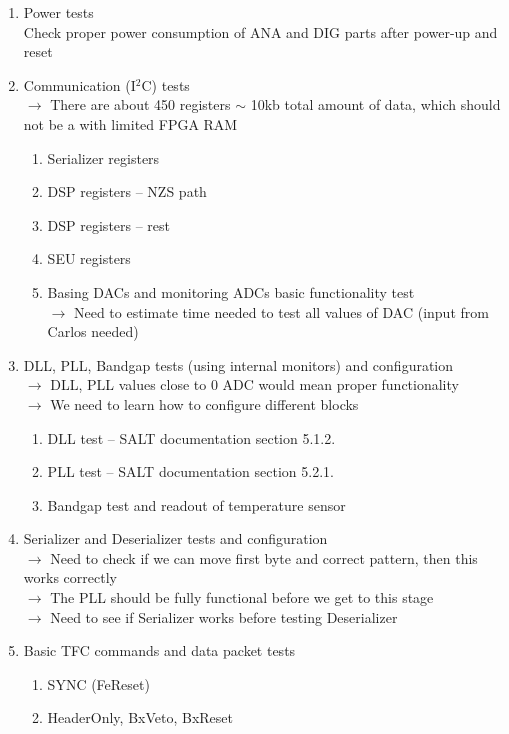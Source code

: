 \documentclass{lhcbnote}
\begin{document}
\begin{enumerate}
\item Power tests \\
Check proper power consumption of ANA and DIG parts after power-up and reset
\item Communication (I$^2$C) tests \\
$\rightarrow$ There are about 450 registers $\sim$ 10kb total amount of data, which should not be a with limited FPGA RAM
\begin{enumerate}
\item Serializer registers
\item DSP registers – NZS path
\item DSP registers – rest
\item SEU registers
\item Basing DACs and monitoring ADCs basic functionality test \\
$\rightarrow$ Need to estimate time needed to test all values of DAC (input from Carlos needed)
\end{enumerate}

\item DLL, PLL, Bandgap tests (using internal monitors) and configuration \\
$\rightarrow$ DLL, PLL values close to 0 ADC would mean proper functionality \\
$\rightarrow$ We need to learn how to configure different blocks
\begin{enumerate}
\item DLL test – SALT documentation section 5.1.2.
\item PLL test – SALT documentation section 5.2.1.
\item Bandgap test and readout of temperature sensor
\end{enumerate}

\item Serializer and Deserializer tests and configuration \\
$\rightarrow$ Need to check if we can move first byte and correct pattern, then this works correctly \\
$\rightarrow$ The PLL should be fully functional before we get to this stage \\
$\rightarrow$ Need to see if Serializer works before testing Deserializer

\item Basic TFC commands and data packet tests
\begin{enumerate}
\item SYNC (FeReset)
\item HeaderOnly, BxVeto, BxReset 
\end{enumerate}


\end{enumerate}
\end{document}
